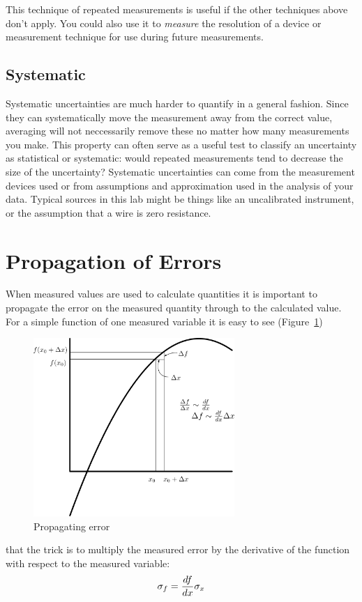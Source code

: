 \documentclass{article}
\begin{document}
This technique of repeated measurements is useful if the other techniques above don't apply.  You could also use it to {\em measure} the resolution of a device or measurement technique for use during future measurements.

\subsection{Systematic}

Systematic uncertainties are much harder to quantify in a general fashion.  Since they can systematically move the measurement away from the correct value, averaging will not neccessarily remove these no matter how many measurements you make.  This property can often serve as a useful test to classify an uncertainty as statistical or systematic: would repeated measurements tend to decrease the size of the uncertainty?  Systematic uncertainties can come from the measurement devices used or from assumptions and approximation used in the analysis of your data.  Typical sources in this lab might be things like an uncalibrated instrument, or the assumption that a wire is zero resistance.

\section{Propagation of Errors}

When measured values are used to calculate quantities it is important to propagate the error on the measured quantity through to the calculated value.  For a simple function of one measured variable it is easy to see (Figure~\ref{fig:error-prop})
\begin{figure}
\includegraphics[width=3in]{images/error-prop.png}
\caption{Propagating error}
\label{fig:error-prop}
\end{figure}
that the trick is to multiply the measured error by the derivative of the function with respect to the measured variable:
\begin{equation}
\sigma_f = {df \over dx} \sigma_x
\end{equation}
\end{document}
